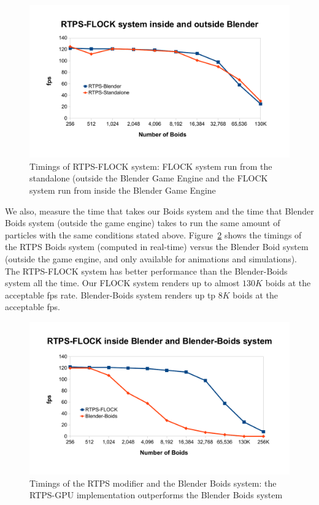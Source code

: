 \begin{figure}[htbp]
\begin{center}
\includegraphics[scale=0.7]{figures/RTPSvsRTPS.pdf}
\caption{Timings of RTPS-FLOCK system: FLOCK system run from the standalone (outside the Blender Game Engine and the FLOCK system run from inside the Blender Game Engine}
\label{RTPSvsRTPS}
\end{center}
\end{figure}

We also, measure the time that takes our Boids system and the time that Blender Boids system (outside the game engine) takes to run the same amount of particles with the same conditions stated above. Figure~\ref{RTPSvsBlender} shows the timings of the RTPS Boids system (computed in real-time) versus the Blender Boid system (outside the game engine, and only available for animations and simulations). The RTPS-FLOCK system has better performance than the Blender-Boids system all the time. Our FLOCK system renders up to almost $130K$ boids at the acceptable fps rate. Blender-Boids system renders up tp $8K$ boids at the acceptable fps.

\begin{figure}[htbp]
\begin{center}
\includegraphics[scale=0.7]{figures/benchmarks.pdf}
\caption{Timings of the RTPS modifier and the Blender Boids system: the RTPS-GPU implementation outperforms the Blender Boids system}
\label{RTPSvsBlender}
\end{center}
\end{figure}

